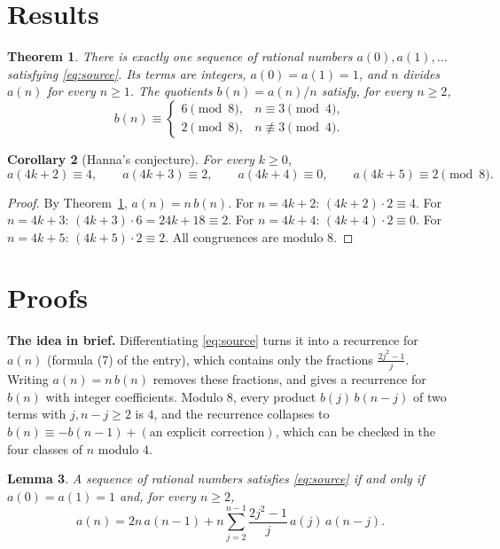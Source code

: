 \documentclass[11pt,a4paper]{article}
\newtheorem{theorem}{Theorem}[section]
\newtheorem{lemma}[theorem]{Lemma}
\newtheorem{corollary}[theorem]{Corollary}
\theoremstyle{definition}
\theoremstyle{remark}
\newcommand{\para}[1]{\par\medskip\noindent\textbf{#1}\enspace}
\begin{document}
\section{Results}\label{sec:results}

\begin{theorem}\label{thm:main}
There is exactly one sequence of rational numbers $a(0),a(1),\dots$ satisfying \eqref{eq:source}. Its terms are
integers, $a(0)=a(1)=1$, and $n$ divides $a(n)$ for every $n\ge1$. The quotients $b(n)=a(n)/n$ satisfy, for every $n\ge2$,
\begin{equation}\label{eq:bres}
b(n)\equiv\begin{cases}6\pmod8,&n\equiv3\pmod4,\\2\pmod8,&n\not\equiv3\pmod4.\end{cases}
\end{equation}
\end{theorem}

\begin{corollary}[Hanna's conjecture]\label{cor:conj}
For every $k\ge0$,
\[
a(4k+2)\equiv4,\qquad a(4k+3)\equiv2,\qquad a(4k+4)\equiv0,\qquad a(4k+5)\equiv2\pmod8 .
\]
\end{corollary}

\begin{proof}
By Theorem~\ref{thm:main}, $a(n)=n\,b(n)$. For $n=4k+2$: $(4k+2)\cdot2\equiv4$. For $n=4k+3$: $(4k+3)\cdot6=24k+18\equiv2$.
For $n=4k+4$: $(4k+4)\cdot2\equiv0$. For $n=4k+5$: $(4k+5)\cdot2\equiv2$. All congruences are modulo $8$.
\end{proof}

\section{Proofs}\label{sec:proofs}

\para{The idea in brief.} Differentiating \eqref{eq:source} turns it into a recurrence for $a(n)$ (formula (7) of the
entry), which contains only the fractions $\frac{2j^2-1}{j}$. Writing $a(n)=n\,b(n)$ removes these fractions, and gives a
recurrence for $b(n)$ with integer coefficients. Modulo $8$, every product $b(j)\,b(n-j)$ of two terms with $j,n-j\ge2$ is
$4$, and the recurrence collapses to $b(n)\equiv-b(n-1)+(\text{an explicit correction})$, which can be checked in the four
classes of $n$ modulo $4$.

\begin{lemma}\label{lem:equiv}
A sequence of rational numbers satisfies \eqref{eq:source} if and only if $a(0)=a(1)=1$ and, for every $n\ge2$,
\begin{equation}\label{eq:rec}
a(n)=2n\,a(n-1)+n\sum_{j=2}^{n-1}\frac{2j^2-1}{j}\,a(j)\,a(n-j).
\end{equation}
\end{lemma}
\end{document}
